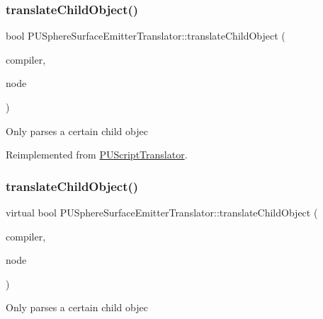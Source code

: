 \subsubsection{\texorpdfstring{translate\+Child\+Object()}{translateChildObject()}\hspace{0.1cm}{\footnotesize\ttfamily [1/2]}}
{\footnotesize\ttfamily bool P\+U\+Sphere\+Surface\+Emitter\+Translator\+::translate\+Child\+Object (\begin{DoxyParamCaption}\item[{\hyperlink{classPUScriptCompiler}{P\+U\+Script\+Compiler} $\ast$}]{compiler,  }\item[{\hyperlink{classPUAbstractNode}{P\+U\+Abstract\+Node} $\ast$}]{node }\end{DoxyParamCaption})\hspace{0.3cm}{\ttfamily [virtual]}}

Only parses a certain child objec 

Reimplemented from \hyperlink{classPUScriptTranslator_ab587d01348ae3e678cb700c719b2b113}{P\+U\+Script\+Translator}.

\mbox{\label{classPUSphereSurfaceEmitterTranslator_a02ae13ed8f8b7a9200ff5bdf80cb4aaa}} 
\subsubsection{\texorpdfstring{translate\+Child\+Object()}{translateChildObject()}\hspace{0.1cm}{\footnotesize\ttfamily [2/2]}}
{\footnotesize\ttfamily virtual bool P\+U\+Sphere\+Surface\+Emitter\+Translator\+::translate\+Child\+Object (\begin{DoxyParamCaption}\item[{\hyperlink{classPUScriptCompiler}{P\+U\+Script\+Compiler} $\ast$}]{compiler,  }\item[{\hyperlink{classPUAbstractNode}{P\+U\+Abstract\+Node} $\ast$}]{node }\end{DoxyParamCaption})\hspace{0.3cm}{\ttfamily [virtual]}}

Only parses a certain child objec 

